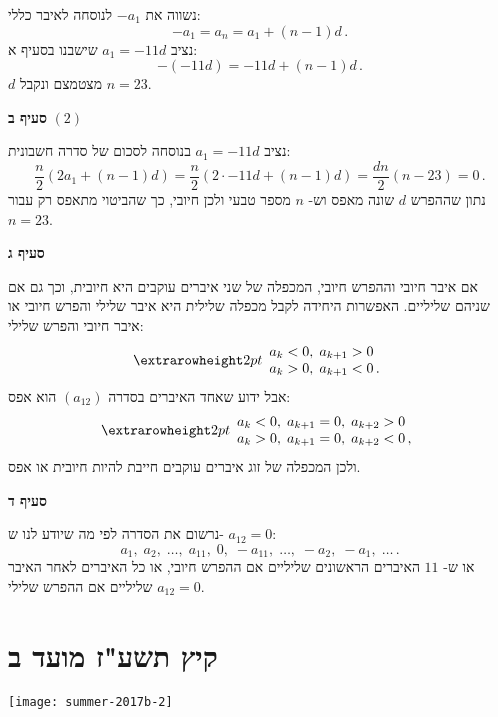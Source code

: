 נשווה את
$-a_1$
לנוסחה לאיבר כללי:
\[
-a_1 = a_n = a_1 + (n-1)d\,.
\]
נציב
$a_1=-11d$
שישבנו בסעיף א:
\[
-(-11d) = -11d + (n-1)d\,.
\]
$d$
מצטמצם ונקבל
$n=23$.

\smallskip

\textbf{סעיף ב}
$(2)$

נציב
$a_1=-11d$
 בנוסחה לסכום של סדרה חשבונית:
\[
\frac{n}{2}(2a_1+(n-1)d) = \frac{n}{2}(2\cdot -11d+(n-1)d) =\frac{dn}{2} (n-23)=0\,.
\]
נתון שההפרש 
$d$
שונה מאפס וש-%
$n$
מספר טבעי ולכן חיובי, כך שהביטוי מתאפס רק עבור
$n=23$.

\np

\textbf{סעיף ג}

אם איבר חיובי וההפרש חיובי, המכפלה של שני איברים עוקבים היא חיובית, וכך גם אם שניהם שליליים. האפשרות היחידה לקבל מכפלה שלילית היא איבר שלילי והפרש חיובי או איבר חיובי והפרש שלילי:
\[
\erh{2pt}
\begin{array}{l}
a_k<0,\; a_{k+1}>0\\
a_k>0,\; a_{k+1}<0\,.
\end{array}
\]
אבל ידוע שאחד האיברים בסדרה 
$(a_{12})$
הוא אפס:
\[
\erh{2pt}
\begin{array}{l}
a_k<0,\; a_{k+1}=0,\; a_{k+2}>0\\
a_k>0,\; a_{k+1}=0,\; a_{k+2}<0\,,
\end{array}
\]
ולכן המכפלה של זוג איברים עוקבים חייבת להיות חיובית או אפס.

\smallskip

\textbf{סעיף ד}

נרשום את הסדרה לפי מה שיודע לנו ש-%
$a_{12}=0$:
\[
a_1,\; a_2,\; \ldots,\; a_{11},\; 0,\; -a_{11},\; \ldots,\; -a_2,\; -a_1,\; \ldots\,.
\]
או ש-%
$11$
האיברים הראשונים שליליים אם ההפרש חיובי, או כל האיברים לאחר האיבר
$a_{12}=0$
שליליים אם ההפרש שלילי.



\np
\section{קיץ תשע"ז מועד ב}

\begin{center}
\texttt{[image: summer-2017b-2]}
\end{center}


